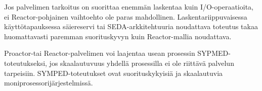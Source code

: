 \documentclass[finnish]{tktltiki2}%
\theoremstyle{definition}
\theoremstyle{remark}
\begin{document}
Jos palvelimen tarkoitus on suorittaa enemmän laskentaa kuin
I/O-operaatioita, ei Reactor-pohjainen vaihtoehto ole paras mahdollinen.
Laskentariippuvaisessa käyttötapauksessa säiereservi tai SEDA-arkkitehtuuria
noudattava toteutus takaa huomattavasti paremman suorituskyvyn kuin
Reactor-mallia noudattava.

Proactor-tai Reactor-palvelimen voi laajentaa
usean prosessin SYPMED-toteutukseksi, jos skaalautuvuus
yhdellä prosessilla ei ole riittävä palvelun tarpeisiin.
SYMPED-toteutukset ovat suorituskykyisiä ja skaalautuvia moniprosessorijärjestelmissä.

\newpage


\end{document}
